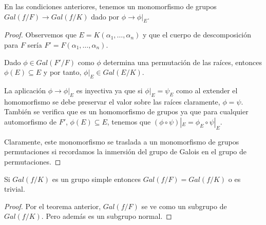\begin{theorem}
En las condiciones anteriores, tenemos un monomorfismo de grupos $Gal(f/F) \to Gal(f/K)$ dado por $\phi \to \phi|_E$.
\end{theorem}
\begin{proof}
Observemos que $E = K(\alpha_1,\ldots,\alpha_n)$ y que el cuerpo de descomposición para $F$ sería $F' = F(\alpha_1,\ldots,\alpha_n)$.

Dado $\phi \in Gal(F'/F)$ como $\phi$ determina una permutación de las raíces, entonces $\phi(E) \subseteq E$ y por tanto, $\phi|_E \in Gal(E/K)$. 

La aplicación $\phi \to \phi|_E$ es inyectiva ya que si $\phi|_E = \psi_E$ como al extender el homomorfismo se debe preservar el valor sobre las raíces claramente, $\phi = \psi$. También se verifica que es un homomorfismo de grupos ya que para cualquier automorfismo de $F'$, $\phi(E) \subseteq E$, tenemos que $(\phi \circ \psi)|_E = \phi_E \circ \psi|_E$.

Claramente, este monomorfismo se traslada a un monomorfismo de grupos permutaciones si recordamos la inmersión del grupo de Galois en el grupo de permutaciones.
\end{proof}

\begin{corollary}
Si $Gal(f/K)$ es un grupo simple entonces $Gal(f/F) = Gal(f/K)$ o es trivial. 
\end{corollary}
\begin{proof}
Por el teorema anterior, $Gal(f/F)$ se ve como un subgrupo de $Gal(f/K)$. Pero además es un subgrupo normal. 
\end{proof}

